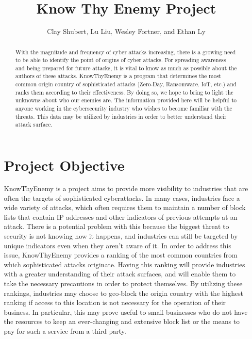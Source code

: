 \documentclass[letterpaper, 10 pt, conference]{ieeeconf}  %
\title{\LARGE \bf
Know Thy Enemy Project
}
\author{Clay Shubert, Lu Liu, Wesley Fortner, and Ethan Ly %
}
\begin{document}
\maketitle
\thispagestyle{empty}
\pagestyle{empty}



\begin{abstract}

With the magnitude and frequency of cyber attacks increasing, there is a growing need to be able to identify the point of origins of cyber attacks. For spreading awareness and being prepared for future attacks, it is vital to know as much as possible about the authors of these attacks. KnowThyEnemy is a program that determines the most common origin country of sophisticated attacks (Zero-Day, Ransomware, IoT, etc.) and ranks them according to their effectiveness. By doing so, we hope to bring to light the unknowns about who our enemies are. The information provided here will be helpful to anyone working in the cybersecurity industry who wishes to become familiar with the threats. This data may be utilized by industries in order to better understand their attack surface. 

\end{abstract}



\section{Project Objective}

KnowThyEnemy is a project aims to provide more visibility to industries that are often the targets of sophisticated cyberattacks.
In many cases, industries face a wide variety of attacks, which often requires them to maintain a number of block lists that contain IP addresses and other indicators of previous attempts at an attack. 
There is a potential problem with this because the biggest threat to security is not knowing how it happens, and industries can still be targeted by unique indicators even when they aren't aware of it. 
In order to address this issue, KnowThyEnemy provides a ranking of the most common countries from which sophisticated attacks originate. 
Having this ranking will provide industries with a greater understanding of their attack surfaces, and will enable them to take the necessary precautions in order to protect themselves. 
By utilizing these rankings, industries may choose to geo-block the origin country with the highest ranking if access to this location is not necessary for the operation of their business.
In particular, this may prove useful to small businesses who do not have the resources to keep an ever-changing and extensive block list or the means to pay for such a service from a third party.
\end{document}
